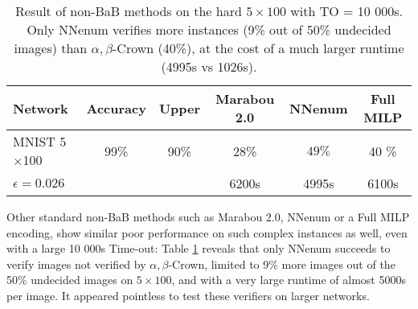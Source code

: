 \begin{table}[t!]
	\centering
	\begin{tabular}{||l|c|c||c|c|c||}
		\hline
		Network &  Accuracy & Upper  & Marabou 2.0 & NNenum &  Full MILP  \\ \hline
		MNIST 5$\times$100 & 99\% & 90\% & 28\% & $49\%$ & 40 \%    \\
		$\epsilon = 0.026$ & &  &6200s &  4995s & 6100s
		  \\  \hline
	\end{tabular}
\caption{Result of non-BaB methods on the hard $5 \times 100$ with TO = 10 000s. 
Only NNenum verifies more instances (9\% out of 50\% undecided images) than $\alpha,\beta$-Crown (40\%), at the cost of a much larger runtime (4995s vs 1026s).}
\label{table_complete}
\end{table}

Other standard non-BaB methods such as Marabou 2.0, NNenum or a Full MILP encoding, show similar poor performance on such complex instances as well, even with a large 10 000s Time-out: Table \ref{table_complete} reveals that only NNenum succeeds to verify images not verified by $\alpha,\beta$-Crown, limited to 9\% more images out of the 50\% undecided images on $5 \times 100$, and with a very large runtime of almost 5000s per image. It appeared pointless to test these verifiers on larger networks.








